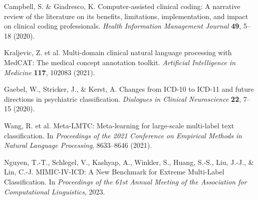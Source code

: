 \documentclass[12pt,a4paper]{report}
\begin{document}
\begin{thebibliography}{99}
Campbell, S. \& Giadresco, K. Computer-assisted clinical coding: A narrative review of the literature on its benefits, limitations, implementation, and impact on clinical coding professionals. \textit{Health Information Management Journal} \textbf{49}, 5–18 (2020).

Kraljevic, Z. et al. Multi-domain clinical natural language processing with MedCAT: The medical concept annotation toolkit. \textit{Artificial Intelligence in Medicine} \textbf{117}, 102083 (2021).

Gaebel, W., Stricker, J., \& Kerst, A. Changes from ICD-10 to ICD-11 and future directions in psychiatric classification. \textit{Dialogues in Clinical Neuroscience} \textbf{22}, 7–15 (2020).

Wang, R. et al. Meta-LMTC: Meta-learning for large-scale multi-label text classification. In \textit{Proceedings of the 2021 Conference on Empirical Methods in Natural Language Processing}, 8633–8646 (2021).

Nguyen, T.-T., Schlegel, V., Kashyap, A., Winkler, S., Huang, S.-S., Liu, J.-J., \& Lin, C.-J. MIMIC-IV-ICD: A New Benchmark for Extreme Multi-Label Classification. In \textit{Proceedings of the 61st Annual Meeting of the Association for Computational Linguistics}, 2023.

\end{thebibliography}
\end{document}
